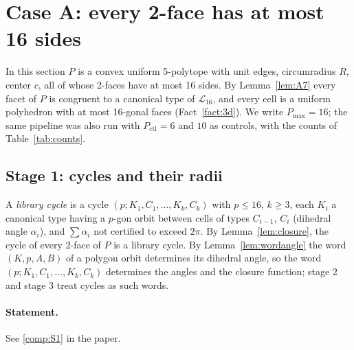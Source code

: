 \documentclass[11pt]{article}
\theoremstyle{definition}
\theoremstyle{remark}
\begin{document}
\section{Case A: every 2-face has at most 16 sides}\label{sec:caseA}

In this section $P$ is a convex uniform 5-polytope with unit edges,
circumradius $R$, center $c$, all of whose 2-faces have at most 16 sides.
By Lemma~\ref{lem:A7} every facet of $P$ is congruent to a canonical type
of $\mathcal L_{16}$, and every cell is a uniform polyhedron with at most
16-gonal faces (Fact~\ref{fact:3d}). We write $P_{\max}=16$; the same
pipeline was also run with $P_{\mathrm{ctl}}=6$ and $10$ as controls, with the
counts of Table~\ref{tab:counts}.

\subsection{Stage 1: cycles and their radii}\label{sec:S1}

A \emph{library cycle} is a cycle $(p;K_1,C_1,\dots,K_k,C_k)$ with
$p\le16$, $k\ge3$, each $K_i$ a canonical type having a $p$-gon orbit
between cells of types $C_{i-1}$, $C_i$ (dihedral angle $\alpha_i$), and
$\sum\alpha_i$ not certified to exceed $2\pi$. By Lemma~\ref{lem:closure},
the cycle of every 2-face of $P$ is a library cycle. By
Lemma~\ref{lem:wordangle} the word $(K,p,A,B)$ of a polygon orbit
determines its dihedral angle, so the word $(p;K_1,C_1,\dots,K_k,C_k)$
determines the angles and the closure function; stage 2 and stage 3 treat
cycles as such words.

\setcounter{theorem}{0}
\paragraph{Statement.} See \ref{comp:S1} in the paper.
\end{document}

